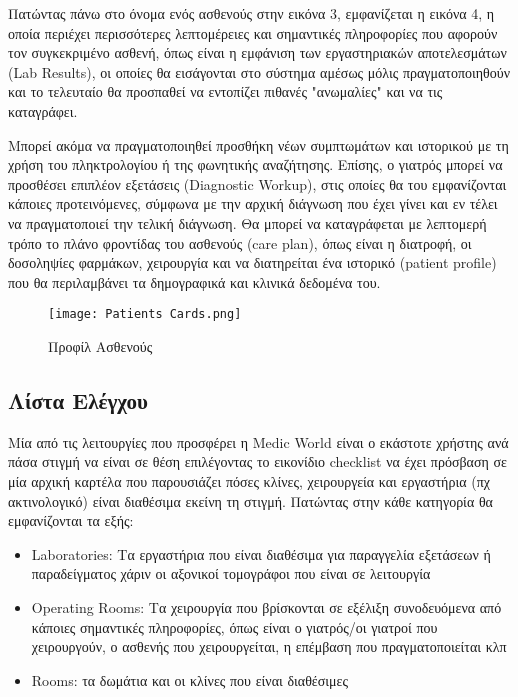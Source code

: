 \documentclass{article}
\begin{document}
Πατώντας πάνω στο όνομα ενός ασθενούς στην εικόνα 3, εμφανίζεται η εικόνα 4, η οποία περιέχει περισσότερες λεπτομέρειες και σημαντικές πληροφορίες που αφορούν τον συγκεκριμένο ασθενή, όπως είναι η εμφάνιση των εργαστηριακών αποτελεσμάτων (Lab Results), οι οποίες θα εισάγονται στο σύστημα αμέσως μόλις πραγματοποιηθούν και το τελευταίο θα προσπαθεί να εντοπίζει πιθανές "ανωμαλίες" και να τις καταγράφει. \par
Μπορεί ακόμα να πραγματοποιηθεί προσθήκη νέων συμπτωμάτων και ιστορικού με τη χρήση του πληκτρολογίου ή της φωνητικής αναζήτησης. Επίσης, ο γιατρός μπορεί να προσθέσει επιπλέον εξετάσεις (Diagnostic Workup), στις οποίες θα του εμφανίζονται κάποιες προτεινόμενες, σύμφωνα με την αρχική διάγνωση που έχει γίνει και εν τέλει να πραγματοποιεί την τελική διάγνωση.
Θα μπορεί να καταγράφεται με λεπτομερή τρόπο το πλάνο φροντίδας του ασθενούς (care plan), όπως είναι η διατροφή, οι δοσοληψίες φαρμάκων, χειρουργία και να διατηρείται ένα ιστορικό (patient profile) που θα περιλαμβάνει τα δημογραφικά και κλινικά δεδομένα του.

\vspace{0.3cm}

\begin{figure}[!htb]
\centering
\texttt{[image: Patients Cards.png]}
\caption{\label{fig:patient profile} Προφίλ Ασθενούς}
\end{figure}


\subsection{Λίστα Ελέγχου}

Μία από τις λειτουργίες που προσφέρει η Medic World είναι ο εκάστοτε χρήστης ανά πάσα στιγμή να είναι σε θέση επιλέγοντας το εικονίδιο checklist να έχει πρόσβαση σε μία αρχική καρτέλα που παρουσιάζει πόσες κλίνες, χειρουργεία και εργαστήρια (πχ ακτινολογικό) είναι διαθέσιμα εκείνη τη στιγμή. Πατώντας στην κάθε κατηγορία θα εμφανίζονται τα εξής:

\begin{itemize}
  \item Laboratories: Τα εργαστήρια που είναι διαθέσιμα για παραγγελία εξετάσεων ή παραδείγματος χάριν οι αξονικοί τομογράφοι που είναι σε λειτουργία
  \item Operating Rooms: Τα χειρουργία που βρίσκονται σε εξέλιξη συνοδευόμενα από κάποιες σημαντικές πληροφορίες, όπως είναι ο γιατρός/οι γιατροί που χειρουργούν, ο ασθενής που χειρουργείται, η επέμβαση που πραγματοποιείται κλπ
  \item Rooms: τα δωμάτια και οι κλίνες που είναι διαθέσιμες
\end{itemize}
\end{document}
